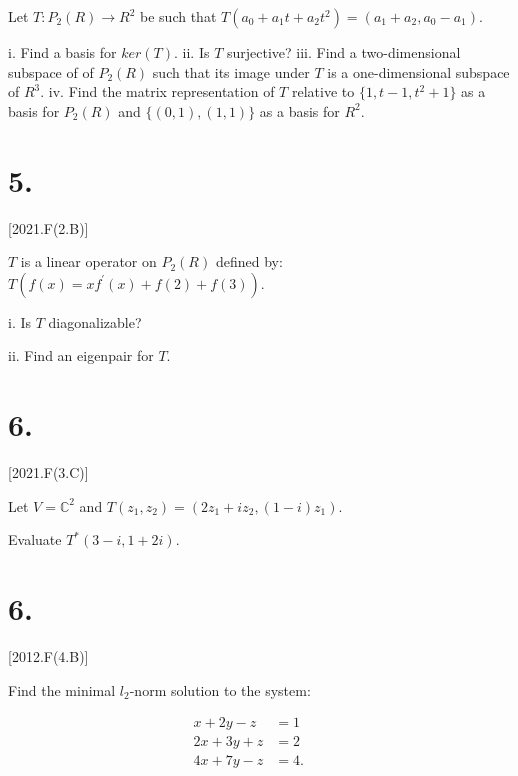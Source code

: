 \documentclass{article}
\begin{document}
  Let $T: P_2(R) \rightarrow R^2$ be such that $T(a_0 + a_1t + a_2t^2) = (a_1+a_2, a_0-a_1)$.

  i. Find a basis for $ker(T)$.
  ii. Is $T$ surjective?
  iii. Find a two-dimensional subspace of of $P_2(R)$ such that its image under $T$ is a one-dimensional subspace of $R^3$.
  iv. Find the matrix representation of $T$ relative to $\{1, t-1, t^2+1 \}$ as a basis for $P_2(R)$ 
  and $\{(0,1), (1,1)\}$ as a basis for $R^2$.


  \section*{5.}[2021.F(2.B)]

  $T$ is a linear operator on $P_2(R)$ defined by:
  \qquad $T(f(x)=xf^\prime(x) + f(2) + f(3))$.

  i. Is $T$ diagonalizable?

  ii. Find an eigenpair for $T$.


  \section*{6.}[2021.F(3.C)]

  Let $V = \mathbb{C}^2$ and $T(z_1, z_2) = (2z_1 + iz_2, (1-i)z_1)$. 
  
  Evaluate $T^*(3-i, 1+2i)$.


  \section*{6.}[2012.F(4.B)]

  Find the minimal $l_2$-norm solution to the system:

  \begin{align*}
    x + 2y  - z &= 1 &&\\
    2x + 3y + z &= 2 &&\\
    4x + 7y - z &= 4.
  \end{align*}
\end{document}
